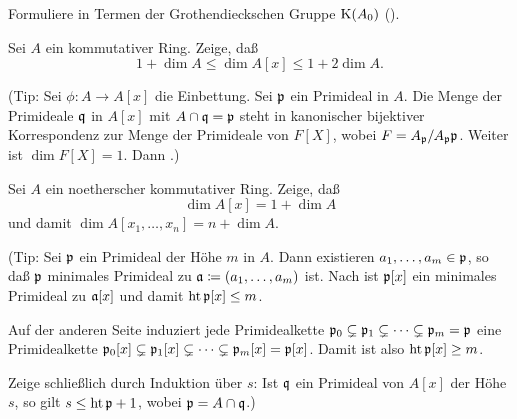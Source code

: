 \begin{exercise}
	Formuliere  in Termen der Grothendieckschen Gruppe \(\operatorname{K}(A_0)\) (). 
\end{exercise}

\begin{exercise}
	\label{exer:poly_dim}
	Sei \(A\) ein kommutativer Ring. Zeige, daß
	\[
		1 + \dim A \le \dim A[x] \le 1 + 2 \dim A.
	\]
	
	(Tip: Sei \(\phi\colon A \to A[x]\) die Einbettung. Sei \(\mathfrak{p}\) ein Primideal in \(A\). Die Menge der Primideale
	\(\mathfrak{q}\) in \(A[x]\) mit \(A \cap \mathfrak{q} = \mathfrak{p}\) steht in kanonischer bijektiver Korrespondenz zur Menge der
	Primideale von \(F[X]\), wobei \(F = A_{\mathfrak{p}}/A_{\mathfrak{p}} \mathfrak{p}\). Weiter ist \(\dim F[X] = 1\). Dann
	.)
\end{exercise}

\begin{exercise}
	Sei \(A\) ein noetherscher kommutativer Ring. Zeige, daß
	\[
		\dim A[x] = 1 + \dim A
	\]
	und damit \(\dim A[x_1, \dotsc, x_n] = n + \dim A\).
	
	(Tip: Sei \(\mathfrak{p}\) ein Primideal der Höhe \(m\) in \(A\). Dann existieren \(a_1, \dotsc, a_m \in \mathfrak{p}\), so daß
	\(\mathfrak{p}\) minimales Primideal zu \(\mathfrak{a} \coloneqq (a_1, \dotsc, a_m)\) ist. Nach 
	ist \(\mathfrak{p}[x]\)	ein minimales Primideal zu \(\mathfrak{a}[x]\) und damit \(\operatorname{ht} \mathfrak{p}[x] \leq m\).
	
	Auf der anderen Seite induziert jede Primidealkette \(\mathfrak{p}_0 \subsetneq \mathfrak{p}_1 \subsetneq \dotsb \subsetneq
	\mathfrak{p}_m = \mathfrak{p}\) eine Primidealkette \(\mathfrak{p}_0[x] \subsetneq \mathfrak{p}_1[x] \subsetneq \dotsb \subsetneq
	\mathfrak{p}_m[x] = \mathfrak{p}[x]\). Damit ist also \(\operatorname{ht} \mathfrak{p}[x] \ge m\).
	
	Zeige schließlich durch Induktion über \(s\): Ist \(\mathfrak{q}\) ein
        Primideal von \(A[x]\) der Höhe \(s\), so gilt \(s \leq
        \operatorname{ht} \mathfrak{p} + 1\), wobei \(\mathfrak{p} = A \cap \mathfrak{q}\).)
\end{exercise}


